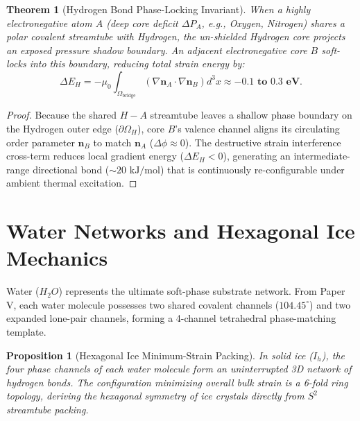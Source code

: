 \documentclass[11pt,a4paper]{article}
\newtheorem{prop}{Proposition}
\newtheorem{thm}{Theorem}
\begin{document}
	\begin{thm}[Hydrogen Bond Phase-Locking Invariant]
		\label{thm:hydrogen_bond}
		When a highly electronegative atom $A$ (deep core deficit $\Delta P_A$, e.g., Oxygen, Nitrogen) shares a polar covalent streamtube with Hydrogen, the un-shielded Hydrogen core projects an exposed pressure shadow boundary. An adjacent electronegative core $B$ soft-locks into this boundary, reducing total strain energy by:
		\begin{equation}
			\Delta E_H = -\mu_0 \int_{\Omega_{\text{bridge}}} \left( \nabla \mathbf{n}_A \cdot \nabla \mathbf{n}_B \right) d^3x \approx -\mathbf{0.1 \text{ to } 0.3 \text{ eV}}.
			\label{eq:hydrogen_bond_strain_integral}
		\end{equation}
	\end{thm}
	
	\begin{proof}
		Because the shared $H-A$ streamtube leaves a shallow phase boundary on the Hydrogen outer edge ($\partial \Omega_H$), core $B$'s valence channel aligns its circulating order parameter $\mathbf{n}_B$ to match $\mathbf{n}_A$ ($\Delta \phi \approx 0$). The destructive strain interference cross-term reduces local gradient energy ($\Delta E_H < 0$), generating an intermediate-range directional bond ($\sim 20 \text{ kJ/mol}$) that is continuously re-configurable under ambient thermal excitation.
	\end{proof}
	
	\section{Water Networks and Hexagonal Ice Mechanics}
	\label{sec:water_networks}
	
	Water ($H_2O$) represents the ultimate soft-phase substrate network. From Paper V, each water molecule possesses two shared covalent channels ($104.45^\circ$) and two expanded lone-pair channels, forming a 4-channel tetrahedral phase-matching template.
	
	\begin{prop}[Hexagonal Ice Minimum-Strain Packing]
		\label{prop:ice_packing}
		In solid ice ($I_h$), the four phase channels of each water molecule form an uninterrupted 3D network of hydrogen bonds. The configuration minimizing overall bulk strain is a 6-fold ring topology, deriving the hexagonal symmetry of ice crystals directly from $S^2$ streamtube packing.
	\end{prop}
	
\end{document}
